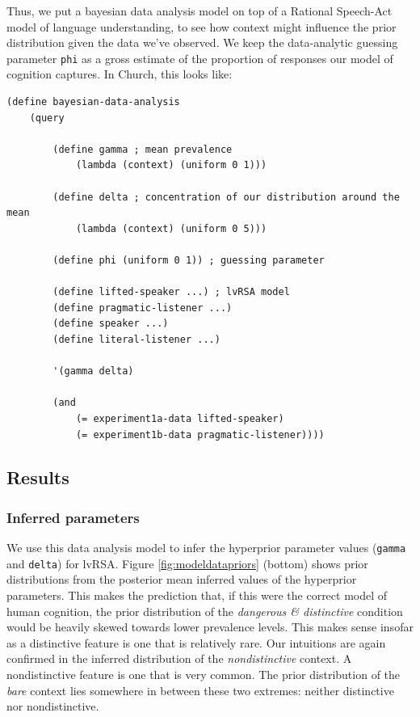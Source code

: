 \documentclass[10pt,letterpaper]{article}
\begin{document}
Thus, we put a bayesian data analysis model on top of a Rational Speech-Act model of language understanding, to see how context might influence the prior distribution given the data we've observed. We keep the data-analytic guessing parameter \lstinline{phi} as a gross estimate of the proportion of responses our model of cognition captures. In Church, this looks like:

\begin{lstlisting}
(define bayesian-data-analysis
	(query
	
		(define gamma ; mean prevalence
			(lambda (context) (uniform 0 1)))
			
		(define delta ; concentration of our distribution around the mean
			(lambda (context) (uniform 0 5)))
			
		(define phi (uniform 0 1)) ; guessing parameter
	
		(define lifted-speaker ...) ; lvRSA model
		(define pragmatic-listener ...)
		(define speaker ...)
		(define literal-listener ...)
				
		'(gamma delta)
				
		(and 
			(= experiment1a-data lifted-speaker)
			(= experiment1b-data pragmatic-listener))))
\end{lstlisting}


\subsection{Results}

\subsubsection{Inferred parameters}
We use this data analysis model to infer the hyperprior parameter values (\lstinline{gamma} and \lstinline{delta}) for lvRSA. Figure \ref{fig:modeldatapriors} (bottom) shows prior distributions from the posterior mean inferred values of the hyperprior parameters. This makes the prediction that, if this were the correct model of human cognition, the prior distribution of the \emph{dangerous \& distinctive} condition would be heavily skewed towards lower prevalence levels. This makes sense insofar as a distinctive feature is one that is relatively rare. Our intuitions are again confirmed in the inferred distribution of the \emph{nondistinctive} context. A nondistinctive feature is one that is very common. The prior distribution of the \emph{bare} context lies somewhere in between these two extremes: neither distinctive nor nondistinctive.
\end{document}
